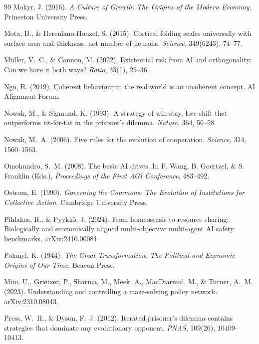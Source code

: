 \documentclass[11pt,a4paper,twocolumn]{article}
\begin{document}
\begin{thebibliography}{99}
 Mokyr, J. (2016). \textit{A Culture of Growth: The Origins of the Modern Economy}. Princeton University Press.

 Mota, B., \& Herculano-Houzel, S. (2015). Cortical folding scales universally with surface area and thickness, not number of neurons. \textit{Science}, 349(6243), 74--77.

 M\"uller, V.~C., \& Cannon, M. (2022). Existential risk from AI and orthogonality: Can we have it both ways? \textit{Ratio}, 35(1), 25--36.

 Ngo, R. (2019). Coherent behaviour in the real world is an incoherent concept. AI Alignment Forum.

 Nowak, M., \& Sigmund, K. (1993). A strategy of win-stay, lose-shift that outperforms tit-for-tat in the prisoner's dilemma. \textit{Nature}, 364, 56--58.

 Nowak, M.~A. (2006). Five rules for the evolution of cooperation. \textit{Science}, 314, 1560--1563.

 Omohundro, S.~M. (2008). The basic AI drives. In P. Wang, B. Goertzel, \& S. Franklin (Eds.), \textit{Proceedings of the First AGI Conference}, 483--492.

 Ostrom, E. (1990). \textit{Governing the Commons: The Evolution of Institutions for Collective Action}. Cambridge University Press.

 Pihlakas, R., \& Pyykk\"o, J. (2024). From homeostasis to resource sharing: Biologically and economically aligned multi-objective multi-agent AI safety benchmarks. arXiv:2410.00081.

 Polanyi, K. (1944). \textit{The Great Transformation: The Political and Economic Origins of Our Time}. Beacon Press.

 Mini, U., Grietzer, P., Sharma, M., Meek, A., MacDiarmid, M., \& Turner, A.~M. (2023). Understanding and controlling a maze-solving policy network. arXiv:2310.08043.

 Press, W.~H., \& Dyson, F.~J. (2012). Iterated prisoner's dilemma contains strategies that dominate any evolutionary opponent. \textit{PNAS}, 109(26), 10409--10413.


\end{thebibliography}
\end{document}

